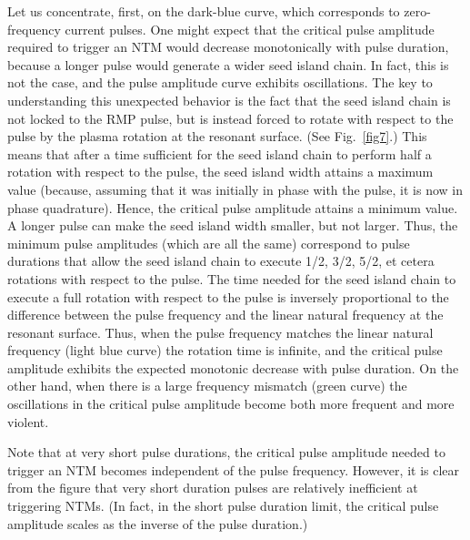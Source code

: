 \documentclass[12pt,prb,aps]{revtex4-1}
\begin{document}
Let us concentrate, first,  on the dark-blue curve, which corresponds to zero-frequency current pulses. One might expect that the critical pulse amplitude required to trigger an NTM would decrease monotonically with pulse duration, because a
longer pulse would generate a wider seed island chain. In fact, this is not the case, and the pulse amplitude curve exhibits oscillations. The key to understanding this unexpected behavior is the fact that the seed island chain is not locked to the RMP pulse, but is instead forced to rotate with respect to the pulse by the plasma rotation at the
resonant surface. (See Fig.~\ref{fig7}.) This means that after a time sufficient for the seed island chain to perform half a rotation with
respect to the pulse, the seed island width attains a maximum value (because, assuming that it was initially
in phase with the pulse,  it is now in phase quadrature). Hence, the critical pulse amplitude attains a
minimum value. A longer pulse can make the seed island width smaller, but not larger. Thus, the minimum pulse
amplitudes (which are all the same) correspond to pulse durations that allow the seed island chain to execute 1/2, 3/2, 5/2, et cetera rotations
with respect to the pulse. The time needed for the seed island chain to execute a full rotation with respect to the pulse is
inversely proportional to the difference between the pulse frequency and the linear natural frequency at the resonant surface. Thus, when the pulse frequency matches the linear natural frequency (light blue curve) the rotation time is infinite, and
the critical pulse amplitude exhibits the expected monotonic decrease with pulse duration. On the other hand, when there is a
large frequency mismatch (green curve) the oscillations in the critical pulse amplitude become both more frequent and
more violent. 

Note that at very short pulse durations, the critical pulse amplitude needed to trigger an NTM becomes independent
of the pulse frequency. However, it is clear from the figure that very short duration pulses are relatively inefficient at 
triggering NTMs. (In fact,  in the
 short pulse duration limit, the critical pulse amplitude scales as the inverse  of the pulse duration.) 
 
\end{document}
